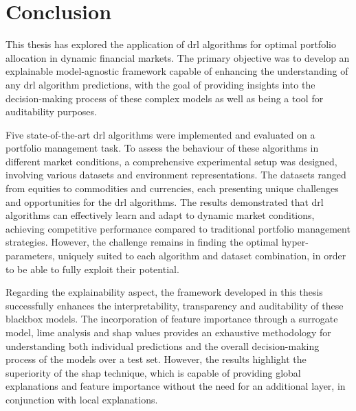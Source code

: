 \chapter{Conclusion} \label{ch:conclusion}

This thesis has explored the application of \acrfull{drl} algorithms for optimal portfolio allocation in dynamic financial markets. The primary objective was to develop an explainable model-agnostic framework capable of enhancing the understanding of any \acrshort{drl} algorithm predictions, with the goal of providing insights into the decision-making process of these complex models as well as being a tool for auditability purposes. 

Five state-of-the-art \acrshort{drl} algorithms were implemented and evaluated on a portfolio management task. To assess the behaviour of these algorithms in different market conditions, a comprehensive experimental setup was designed, involving various datasets and environment representations. The datasets ranged from equities to commodities and currencies, each presenting unique challenges and opportunities for the \acrshort{drl} algorithms. The results demonstrated that \acrshort{drl} algorithms can effectively learn and adapt to dynamic market conditions, achieving competitive performance compared to traditional portfolio management strategies. However, the challenge remains in finding the optimal hyper-parameters, uniquely suited to each algorithm and dataset combination, in order to be able to fully exploit their potential.

Regarding the explainability aspect, the framework developed in this thesis successfully enhances the interpretability, transparency and auditability of these \gls{blackbox} models. The incorporation of feature importance through a surrogate model, \acrfull{lime} analysis and \acrfull{shap} values provides an exhaustive methodology for understanding both individual predictions and the overall decision-making process of the models over a test set. However, the results highlight the superiority of the \acrshort{shap} technique, which is capable of providing global explanations and feature importance without the need for an additional layer, in conjunction with local explanations. 
